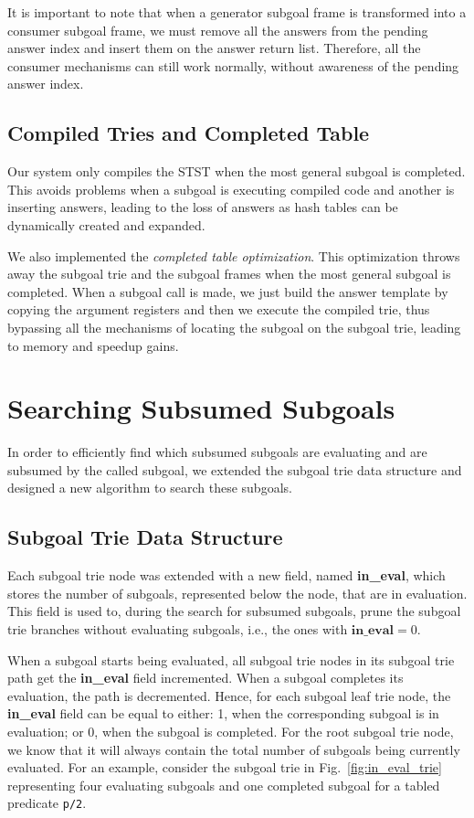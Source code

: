 It is important to note that when a generator subgoal frame is transformed into a
consumer subgoal frame, we must remove all the answers from the pending answer index
and insert them on the answer return list. Therefore, all the consumer mechanisms
can still work normally, without awareness of the pending answer index.

\subsection{Compiled Tries and Completed Table}

Our system only compiles the STST when the most general subgoal is completed.
This avoids problems when a subgoal is executing compiled code and another
is inserting answers, leading to the loss of answers as hash tables can be
dynamically created and expanded.

We also implemented the \textit{completed table optimization}. This optimization throws
away the subgoal trie and the subgoal frames when the most general subgoal is completed.
When a subgoal call is made, we just build the answer template by copying the argument
registers and then we execute the compiled trie, thus bypassing all the mechanisms of
locating the subgoal on the subgoal trie, leading to memory and speedup gains. 

\section{Searching Subsumed Subgoals}

In order to efficiently find which subsumed subgoals are evaluating and are subsumed
by the called subgoal, we extended the subgoal trie data structure and designed a new
algorithm to search these subgoals.

\subsection{Subgoal Trie Data Structure}

Each subgoal trie node was extended with a new field, named
\textbf{in\_eval}, which stores the number of subgoals, represented below the
node, that are in evaluation. This field is used to, during the search
for subsumed subgoals, prune the subgoal trie branches without
evaluating subgoals, i.e., the ones with $\textbf{in\_eval} = 0$.

When a subgoal starts being evaluated, all subgoal trie nodes in its
subgoal trie path get the \textbf{in\_eval} field incremented. When a subgoal
completes its evaluation, the path is decremented. Hence, for each
subgoal leaf trie node, the \textbf{in\_eval} field can be equal to either:
1, when the corresponding subgoal is in evaluation; or 0, when the
subgoal is completed. For the root subgoal trie node, we know that it
will always contain the total number of subgoals being currently
evaluated. For an example, consider the subgoal trie in
Fig.~\ref{fig:in_eval_trie} representing four evaluating subgoals and
one completed subgoal for a tabled predicate \texttt{p/2}.

